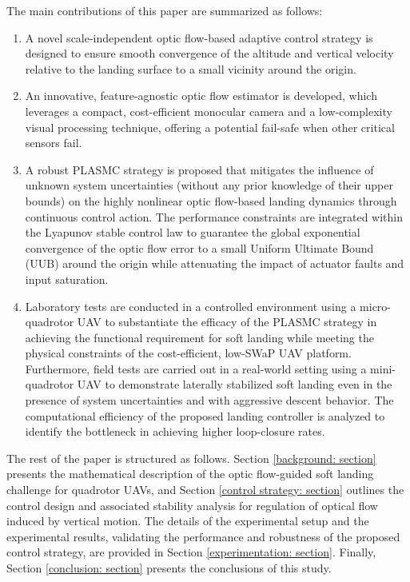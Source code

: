 \documentclass{IEEEtaes}
\begin{document}
The main contributions of this paper are summarized as follows:
\begin{enumerate} 
    \item[(a)] A novel scale-independent optic flow-based adaptive control strategy is designed to ensure smooth convergence of the altitude and vertical velocity relative to the landing surface to a small vicinity around the origin.
    \item[(b)] An innovative, feature-agnostic optic flow estimator is developed, which leverages a compact, cost-efficient monocular camera and a low-complexity visual processing technique, offering a potential fail-safe when other critical sensors fail.
    \item[(c)] A robust PLASMC strategy is proposed that mitigates the influence of unknown system uncertainties (without any prior knowledge of their upper bounds) on the highly nonlinear optic flow-based landing dynamics through continuous control action.
    The performance constraints are integrated within the Lyapunov stable control law to guarantee the global exponential convergence of the optic flow error to a small Uniform Ultimate Bound (UUB) around the origin while attenuating the impact of actuator faults and input saturation.
    \item[(d)] Laboratory tests are conducted in a controlled environment using a micro-quadrotor UAV to substantiate the efficacy of the PLASMC strategy in achieving the functional requirement for soft landing while meeting the physical constraints of the cost-efficient, low-SWaP UAV platform.
    Furthermore, field tests are carried out in a real-world setting using a mini-quadrotor UAV to demonstrate laterally stabilized soft landing even in the presence of system uncertainties and with aggressive descent behavior.
    The computational efficiency of the proposed landing controller is analyzed to identify the bottleneck in achieving higher loop-closure rates.
\end{enumerate}
The rest of the paper is structured as follows. Section \ref{background: section} presents the mathematical description of the optic flow-guided soft landing challenge for quadrotor UAVs, and Section \ref{control strategy: section} outlines the control design and associated stability analysis for regulation of optical flow induced by vertical motion. The details of the experimental setup and the experimental results, validating the performance and robustness of the proposed control strategy, are provided in Section \ref{experimentation: section}. Finally, Section \ref{conclusion: section} presents the conclusions of this study.
\end{document}
